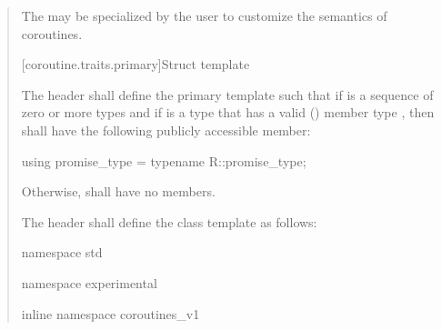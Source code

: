 \begin{quote}
\pnum
The  may be specialized by the user 
to customize the semantics of coroutines.

%
%

[coroutine.traits.primary]{Struct template }
\cbstart
\begin{addedblock}
\pnum The header  shall define
the primary template  such that 
if  is a sequence of zero or more types and if  is a type that has a valid () member type , then
 shall have the following publicly accessible member:

\begin{codeblock}
  using promise_type = typename R::promise_type;
\end{codeblock}

Otherwise,  shall have no members.
\end{addedblock}
	

\begin{removedblock}
\pnum The header  shall define
the class template  as follows:

%
\begin{codeblock}
namespace std {
namespace experimental {
inline namespace coroutines_v1 {
  
}}}
\end{codeblock}
\end{removedblock}
\end{quote}
